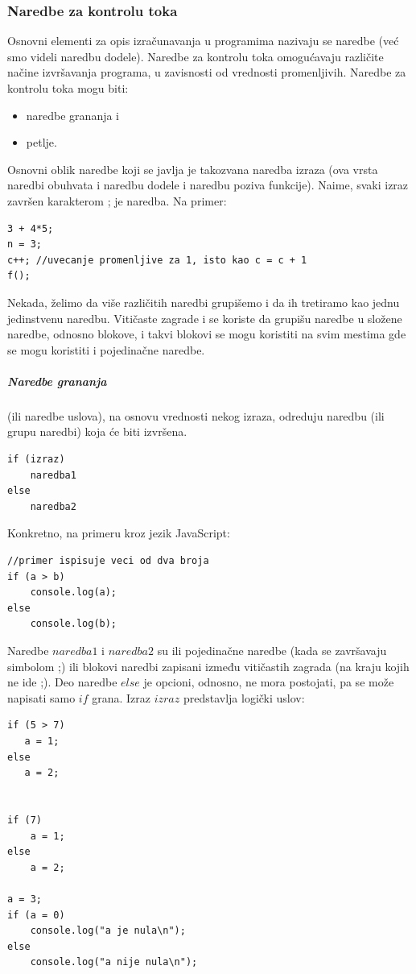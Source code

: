 \documentclass[a4paper]{article}
\begin{document}
\subsubsection{Naredbe za kontrolu toka}
Osnovni elementi za opis izračunavanja u programima nazivaju se naredbe (već smo videli naredbu dodele).
Naredbe za kontrolu toka omogućavaju različite načine izvršavanja programa, u zavisnosti od vrednosti promenljivih. Naredbe za kontrolu toka mogu biti:
\begin{itemize}
\item naredbe grananja i 
\item petlje.
\end{itemize}
Osnovni oblik naredbe koji se javlja je takozvana naredba izraza (ova vrsta naredbi obuhvata i naredbu dodele i naredbu poziva funkcije).
Naime, svaki izraz završen karakterom ; je naredba. Na primer:
\begin{lstlisting}[backgroundcolor = \color{lightgray}]
3 + 4*5;
n = 3;
c++; //uvecanje promenljive za 1, isto kao c = c + 1
f();	
\end{lstlisting}
Nekada, želimo da više različitih naredbi grupišemo i da ih tretiramo kao jednu jedinstvenu naredbu. Vitičaste zagrade { i } se koriste da grupišu naredbe u složene naredbe, odnosno blokove, i takvi blokovi se mogu koristiti na svim mestima gde se mogu koristiti i pojedinačne naredbe. 

\subparagraph{Naredbe grananja} (ili naredbe uslova), na osnovu vrednosti nekog izraza, odreduju naredbu (ili grupu naredbi) koja će biti izvršena.
\begin{lstlisting}[backgroundcolor = \color{lightgray}]
if (izraz)
    naredba1
else
    naredba2
\end{lstlisting}
Konkretno, na primeru kroz jezik JavaScript:
\begin{lstlisting}[backgroundcolor = \color{lightgray}]
//primer ispisuje veci od dva broja
if (a > b)
    console.log(a);
else
    console.log(b);
\end{lstlisting}
Naredbe $naredba1$ i $naredba2$ su ili pojedinačne naredbe (kada se završavaju simbolom ;) ili blokovi naredbi zapisani između vitičastih zagrada (na kraju kojih ne ide ;).
Deo naredbe $else$ je opcioni, odnosno, ne mora postojati, pa se može napisati samo $if$ grana.
Izraz $izraz$ predstavlja logički uslov:
\begin{lstlisting}[backgroundcolor = \color{lightgray}]
if (5 > 7)
   a = 1;
else
   a = 2;


if (7)
    a = 1;
else 
    a = 2;
    
a = 3;
if (a = 0)
    console.log("a je nula\n");
else
    console.log("a nije nula\n");
\end{lstlisting}
\end{document}
